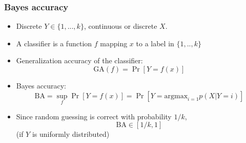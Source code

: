 \documentclass{beamer}
\begin{document}
{

}

\begin{frame}
\frametitle{Bayes accuracy}
\begin{itemize}
\item Discrete $Y \in \{1,...,k\}$, continuous or discrete $X$.
\item A classifier is a function $f$ mapping $x$ to a label in $\{1,..,k\}$
\item Generalization accuracy of the classifier:
\[
\text{GA}(f) = \Pr[Y = f(x)]
\]
\item Bayes accuracy:
\[
\text{BA} = \sup_f \Pr[Y = f(x)] = \Pr[Y = \text{argmax}_{i=1} p(X|Y=i)]
\]
\item Since random guessing is correct with probability $1/k$,
\[
\text{BA} \in [1/k, 1]
\]
(if $Y$ is uniformly distributed)
\end{itemize}
\end{frame}
\end{document}
